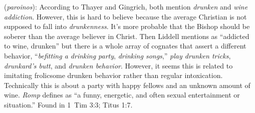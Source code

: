 \item[Wine romp,]

(\textit{paroinos}):
According to Thayer and Gingrich, both mention \emph{drunken} and \emph{wine addiction}. However, this is hard to believe because the average Christian is not supposed to fall into \emph{drunkenness}. It's more probable that the Bishop should be soberer than the average believer in Christ. Then Liddell mentions  as ``addicted to wine, drunken'' but there is a whole array of cognates that assert a different behavior,  ``\emph{befitting a drinking party}, \emph{drinking songs},''  \emph{play drunken tricks},  \emph{drunkard's butt}, and  \emph{drunken behavior}. However, it seems this is related to imitating frolicsome drunken behavior rather than regular intoxication. Technically this is about a party with happy fellows and an unknown amount of wine. \emph{Romp} defines as ``a funny, energetic, and often sexual entertainment or situation.''
Found in 1~Tim 3:3; Titus 1:7.
